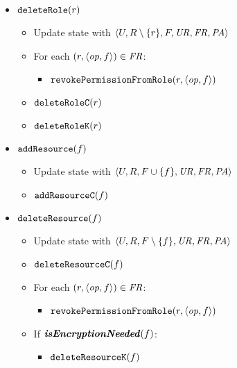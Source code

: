 {\begin{itemize}
        \item \( \mathtt{deleteRole}(r) \)
        \begin{itemize}
            \item Update state with \( \langle U, \allowbreak R \setminus \lbrace r \rbrace, \allowbreak F, \allowbreak \mathit{UR}, \allowbreak \mathit{FR}, \allowbreak \mathit{PA} \rangle \)
            \item For each \( (r, \langle \mathit{op}, \allowbreak f \rangle) \in \mathit{FR} \):
            \begin{itemize}
                \item \( \mathtt{revokePermissionFromRole}(r, \langle \mathit{op}, f \rangle) \)
            \end{itemize}
            \item \( \mathtt{deleteRole}\mathtt{C}(r) \)
            \item \( \mathtt{deleteRole}\mathtt{K}(r) \)
        \end{itemize}

        \item \( \mathtt{addResource}(f) \)
        \begin{itemize}
            \item Update state with \( \langle U, \allowbreak R, \allowbreak F \cup \lbrace f \rbrace, \allowbreak \mathit{UR}, \allowbreak \mathit{FR}, \allowbreak \mathit{PA} \rangle \)
            \item \( \mathtt{addResource}\mathtt{C}(f) \)
        \end{itemize}

        \item \( \mathtt{deleteResource}(f) \)
        \begin{itemize}
            \item Update state with \( \langle U, \allowbreak R, \allowbreak F \setminus \lbrace f \rbrace, \allowbreak \mathit{UR}, \allowbreak \mathit{FR}, \allowbreak \mathit{PA} \rangle \)
            \item \( \mathtt{deleteResource}\mathtt{C}(f) \)
            \item For each \( (r, \langle \mathit{op}, \allowbreak f \rangle) \in \mathit{FR} \):
            \begin{itemize}
                \item \( \mathtt{revokePermissionFromRole}(r, \langle \mathit{op}, f \rangle) \)
            \end{itemize}
            \item If \( \textbf{\textit{isEncryptionNeeded}}(f) \):
            \begin{itemize}
                \item \( \mathtt{deleteResource}\mathtt{K}(f) \)
            \end{itemize}
        \end{itemize}


\end{itemize}}

